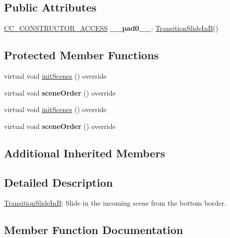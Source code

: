 \subsection*{Public Attributes}
\begin{DoxyCompactItemize}
\item 
\mbox{\label{classTransitionSlideInB_a1d96a884865f31d96cdfd540b3af3b4c}} 
\hyperlink{_2cocos2d_2cocos_2base_2ccConfig_8h_a25ef1314f97c35a2ed3d029b0ead6da0}{C\+C\+\_\+\+C\+O\+N\+S\+T\+R\+U\+C\+T\+O\+R\+\_\+\+A\+C\+C\+E\+SS} {\bfseries \+\_\+\+\_\+pad0\+\_\+\+\_\+}\+: \hyperlink{classTransitionSlideInB}{Transition\+Slide\+InB}()
\end{DoxyCompactItemize}
\subsection*{Protected Member Functions}
\begin{DoxyCompactItemize}
\item 
virtual void \hyperlink{classTransitionSlideInB_abe143990b357e249716a54e72249ac96}{init\+Scenes} () override
\item 
\mbox{\label{classTransitionSlideInB_a9f5e71168561117563325d880474c1b1}} 
virtual void {\bfseries scene\+Order} () override
\item 
virtual void \hyperlink{classTransitionSlideInB_afd38bcea49403ae2b80cd069f46d399c}{init\+Scenes} () override
\item 
\mbox{\label{classTransitionSlideInB_a7319057f8c467bbe1708074ace0302e2}} 
virtual void {\bfseries scene\+Order} () override
\end{DoxyCompactItemize}
\subsection*{Additional Inherited Members}


\subsection{Detailed Description}
\hyperlink{classTransitionSlideInB}{Transition\+Slide\+InB}\+: Slide in the incoming scene from the bottom border. 

\subsection{Member Function Documentation}
\mbox{\label{classTransitionSlideInB_ad67db28968c6152f4412bb86fd0fd4ef}} 
